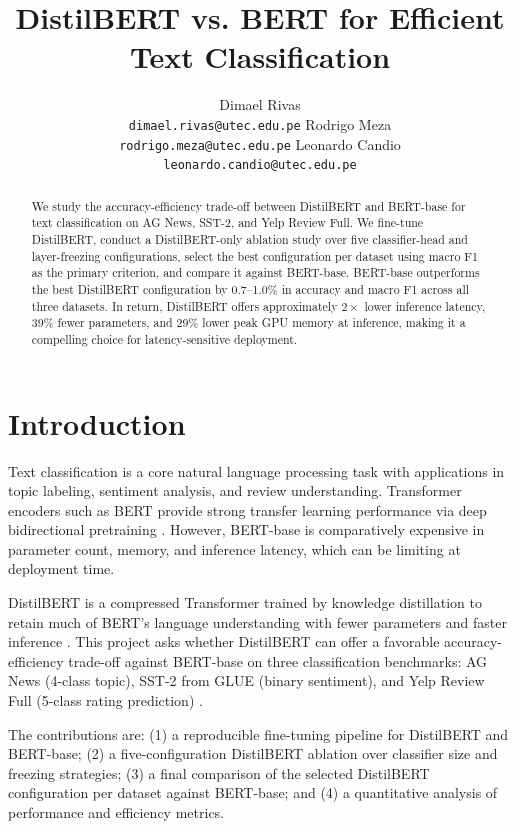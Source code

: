 \documentclass{article}
\title{DistilBERT vs. BERT for Efficient Text Classification}
\author{%
  Dimael Rivas\\
  \texttt{dimael.rivas@utec.edu.pe}
  \And
  Rodrigo Meza\\
  \texttt{rodrigo.meza@utec.edu.pe}
  \And
  Leonardo Candio\\
  \texttt{leonardo.candio@utec.edu.pe}
}
\begin{document}
\maketitle

\begin{abstract}
We study the accuracy-efficiency trade-off between DistilBERT and BERT-base for text classification on AG News, SST-2, and Yelp Review Full. We fine-tune DistilBERT, conduct a DistilBERT-only ablation study over five classifier-head and layer-freezing configurations, select the best configuration per dataset using macro F1 as the primary criterion, and compare it against BERT-base. BERT-base outperforms the best DistilBERT configuration by 0.7–1.0\% in accuracy and macro F1 across all three datasets. In return, DistilBERT offers approximately $2\times$ lower inference latency, 39\% fewer parameters, and 29\% lower peak GPU memory at inference, making it a compelling choice for latency-sensitive deployment.
\end{abstract}

\section{Introduction}
Text classification is a core natural language processing task with applications in topic labeling, sentiment analysis, and review understanding. Transformer encoders such as BERT provide strong transfer learning performance via deep bidirectional pretraining \citep{devlin2019bert}. However, BERT-base is comparatively expensive in parameter count, memory, and inference latency, which can be limiting at deployment time.

DistilBERT is a compressed Transformer trained by knowledge distillation to retain much of BERT's language understanding with fewer parameters and faster inference \citep{sanh2019distilbert}. This project asks whether DistilBERT can offer a favorable accuracy-efficiency trade-off against BERT-base on three classification benchmarks: AG News (4-class topic), SST-2 from GLUE (binary sentiment), and Yelp Review Full (5-class rating prediction) \citep{zhang2015character,wang2018glue}.

The contributions are: (1) a reproducible fine-tuning pipeline for DistilBERT and BERT-base; (2) a five-configuration DistilBERT ablation over classifier size and freezing strategies; (3) a final comparison of the selected DistilBERT configuration per dataset against BERT-base; and (4) a quantitative analysis of performance and efficiency metrics.
\end{document}
